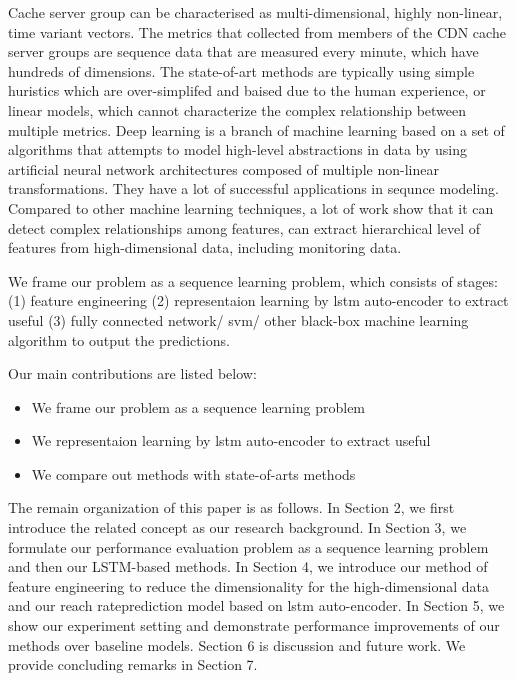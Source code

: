 \documentclass[5p]{elsarticle}
\newcommand{\dabiaolv}{reach rate}
\begin{document}
Cache server group can be characterised as multi-dimensional, highly non-linear, time variant vectors. The metrics that collected from members of the CDN cache server groups are sequence data that are measured every minute, which have hundreds of dimensions. The state-of-art methods are typically using simple huristics  which are over-simplifed and baised due to the human experience, or linear models, which cannot characterize the complex relationship between multiple metrics. Deep learning is a branch of machine learning based on a set of algorithms that attempts to model high-level abstractions in data by using artificial neural network architectures composed of multiple non-linear transformations. They have a lot of successful applications in sequnce modeling. Compared to other machine learning techniques, a lot of work show that it can detect complex relationships among features, can extract hierarchical level of features from high-dimensional data, including monitoring data.

We frame our problem as a sequence learning problem, which consists of stages: (1) feature engineering (2) representaion learning by lstm auto-encoder to extract useful (3) fully connected network/ svm/ other black-box machine learning algorithm to output the predictions. 

Our main contributions are listed below:
\begin{itemize}
  \item We frame our problem as a sequence learning problem
  \item We representaion learning by lstm auto-encoder to extract useful
  \item We compare out methods with state-of-arts methods
\end{itemize}

The remain organization of this paper is as follows. In Section 2, we first introduce the related concept as our research background. In Section 3, we formulate our performance evaluation problem as a sequence learning problem and then our LSTM-based methods. In Section 4, we introduce our method of feature engineering to reduce the dimensionality for the high-dimensional data and  our \dabiaolv prediction model based on lstm auto-encoder. In Section 5, we show our experiment setting and demonstrate performance improvements of our methods over baseline models. Section 6 is discussion and future work. We provide concluding remarks in Section 7.
\end{document}
